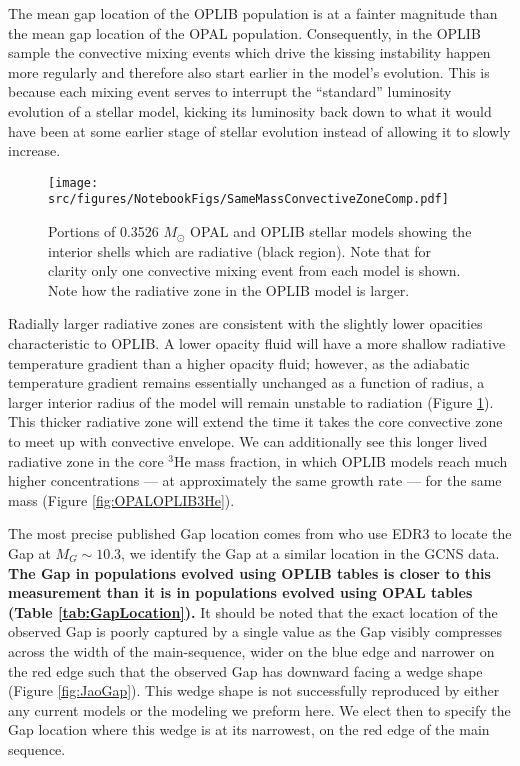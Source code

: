 The mean gap location of the OPLIB population is at a fainter magnitude than the
mean gap location of the OPAL population. Consequently, in the OPLIB sample the
convective mixing events which drive the kissing instability happen more
regularly and therefore also start earlier in the model's evolution. This is
because each mixing event serves to interrupt the ``standard'' luminosity
evolution of a stellar model, kicking its luminosity back down to what it would
have been at some earlier stage of stellar evolution instead of allowing it to
slowly increase.

\begin{figure}[H]
	\centering
	\texttt{[image: src/figures/NotebookFigs/SameMassConvectiveZoneComp.pdf]}
	\caption{Portions of 0.3526 $M_{\odot}$ OPAL and OPLIB stellar models
	showing the interior shells which are radiative (black region). Note that
	for clarity only one convective mixing event from each model is shown. Note
	how the radiative zone in the OPLIB model is larger.}
	\label{fig:Unstable}
\end{figure}

Radially larger radiative zones are consistent with the slightly lower
opacities characteristic to OPLIB. A lower opacity fluid will have a more
shallow radiative temperature gradient than a higher opacity fluid; however, as
the adiabatic temperature gradient remains essentially unchanged as a function
of radius, a larger interior radius of the model will remain unstable to
radiation (Figure \ref{fig:Unstable}). This thicker radiative zone will extend
the time it takes the core convective zone to meet up with convective envelope.
We can additionally see this longer lived radiative zone in the core $^{3}$He
mass fraction, in which OPLIB models reach much higher concentrations --- at
approximately the same growth rate --- for the same mass (Figure
\ref{fig:OPALOPLIB3He}). 

The most precise published Gap location comes from \citet{Jao2020} who use EDR3
to locate the Gap at $M_{G} \sim 10.3$, we identify the Gap at a similar
location in the GCNS data. \textbf{The Gap in populations evolved using OPLIB
tables is closer to this measurement than it is in populations evolved using
OPAL tables (Table \ref{tab:GapLocation}).} It should be noted that the exact
location of the observed Gap is poorly captured by a single value as the Gap
visibly compresses across the width of the main-sequence, wider on the blue
edge and narrower on the red edge such that the observed Gap has downward
facing a wedge shape (Figure \ref{fig:JaoGap}). This wedge shape is not
successfully reproduced by either any current models or the modeling we preform
here. We elect then to specify the Gap location where this wedge is at its
narrowest, on the red edge of the main sequence.


